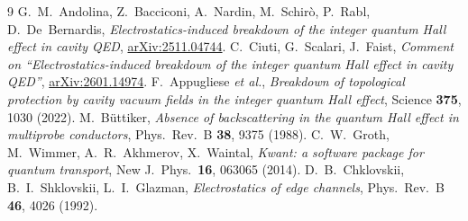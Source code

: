 \documentclass[11pt,a4paper]{article}
\begin{document}
\begin{thebibliography}{9}
 G.~M.~Andolina, Z.~Bacciconi, A.~Nardin, M.~Schirò,
  P.~Rabl, D.~De~Bernardis, \emph{Electrostatics-induced breakdown of the
  integer quantum Hall effect in cavity QED},
  \href{https://arxiv.org/abs/2511.04744}{arXiv:2511.04744}.
 C.~Ciuti, G.~Scalari, J.~Faist, \emph{Comment on
  ``Electrostatics-induced breakdown of the integer quantum Hall effect in
  cavity QED''}, \href{https://arxiv.org/abs/2601.14974}{arXiv:2601.14974}.
 F.~Appugliese \emph{et al.}, \emph{Breakdown of
  topological protection by cavity vacuum fields in the integer quantum Hall
  effect}, Science \textbf{375}, 1030 (2022).
 M.~Büttiker, \emph{Absence of backscattering in the
  quantum Hall effect in multiprobe conductors}, Phys.\ Rev.\ B \textbf{38},
  9375 (1988).
 C.~W.~Groth, M.~Wimmer, A.~R.~Akhmerov, X.~Waintal,
  \emph{Kwant: a software package for quantum transport}, New J.\ Phys.\
  \textbf{16}, 063065 (2014).
 D.~B.~Chklovskii, B.~I.~Shklovskii, L.~I.~Glazman,
  \emph{Electrostatics of edge channels}, Phys.\ Rev.\ B \textbf{46}, 4026
  (1992).
\end{thebibliography}
\end{document}
